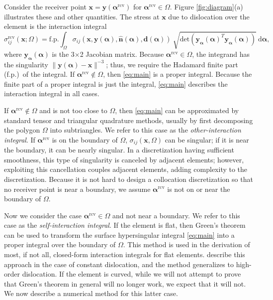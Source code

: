 \documentclass[11pt]{article}
\renewcommand{\vec}[1]{\boldsymbol{#1}}
\newcommand{\uvec}[1]{\hat{\boldsymbol{#1}}}
\newcommand{\suprcv}[1]{#1^{\mathrm{rcv}}}
\begin{document}
Consider the receiver point
$\vec{x} = \vec{y}(\suprcv{\vec{\alpha}})$ for $\suprcv{\vec{\alpha}} \in \Omega$.
Figure \ref{fig:diagram}(a) illustrates these and other quantities.
The stress at $\vec{x}$ due to dislocation over the element is the interaction integral
\begin{equation} \label{eq:main}
  \sigma_{ij}^\mathrm{rcv}(\vec{x}; \Omega) =
  \mathrm{f.p.} \int_\Omega
    \sigma_{ij}(\vec{x}, \vec{y}(\vec{\alpha}), \uvec{n}(\vec{\alpha}), \vec{d}(\vec{\alpha})) \
    \sqrt{\mathrm{det}(\vec{y}_{\vec{\alpha}}(\vec{\alpha})^T \vec{y}_{\vec{\alpha}}(\vec{\alpha}))} \
    \mathrm{d} \vec{\alpha},
\end{equation}
where $\vec{y}_{\vec{\alpha}}(\vec{\alpha})$ is
the 3$\times$2 Jacobian matrix.
Because $\suprcv{\vec{\alpha}} \in \Omega$,
the integrand has the singularity $\|\vec{y}(\vec{\alpha}) - \vec{x}\|^{-3}$;
thus, we require the Hadamard finite part (f.p.)~of the integral.
If $\suprcv{\vec{\alpha}} \notin \Omega$,
then \eqref{eq:main} is a proper integral.
Because the finite part of a proper integral is just the integral,
\eqref{eq:main} describes the interaction integral in all cases.

If $\suprcv{\vec{\alpha}} \notin \Omega$
and is not too close to $\Omega$,
then \eqref{eq:main} can be approximated by
standard tensor and triangular \citep[e.g.][]{Dunavant1985,Taylor2007,Zhang2009} quadrature methods,
usually by first decomposing the polygon $\Omega$ into subtriangles.
We refer to this case as the \emph{other-interaction integral}.
If $\suprcv{\vec{\alpha}}$ is on the boundary of $\Omega$,
$\sigma_{ij}(\vec{x},\Omega)$ can be singular;
if it is near the boundary, it can be nearly singular.
In a discretization having sufficient smoothness,
this type of singularity is canceled by adjacent elements;
however, exploiting this cancellation couples adjacent elements,
adding complexity to the discretization.
Because it is not hard to design a collocation discretization so that
no receiver point is near a boundary,
we assume $\suprcv{\vec{\alpha}}$ is not on or near the boundary of $\Omega$.

Now we consider the case $\suprcv{\vec{\alpha}} \in \Omega$
and not near a boundary.
We refer to this case as the \emph{self-interaction integral}.
If the element is flat,
then Green's theorem can be used to transform
the surface hypersingular integral \eqref{eq:main} into
a proper integral over the boundary of $\Omega$.
This method is used in the derivation of most, if not all,
closed-form interaction integrals for flat elements.
\citet{gimbutas2012calculation} describe this approach
in the case of constant dislocation,
and the method generalizes to high-order dislocation.
If the element is curved,
while we will not attempt to prove that Green's theorem in general will no longer work,
we expect that it will not.
We now describe a numerical method for this latter case.
\end{document}
